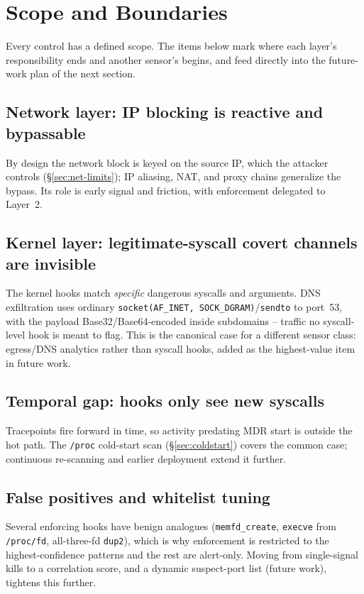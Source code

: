\documentclass[11pt]{article}
\newcommand{\co}[1]{\texttt{#1}}
\begin{document}
\section{Scope and Boundaries}
\label{sec:limits}
Every control has a defined scope. The items below mark where each layer's
responsibility ends and another sensor's begins, and feed directly into the
future-work plan of the next section.

\subsection{Network layer: IP blocking is reactive and bypassable}
\label{sec:l1-limits-detail}
By design the network block is keyed on the source IP, which the attacker
controls (\S\ref{sec:net-limits}); IP aliasing, NAT, and proxy chains
generalize the bypass. Its role is early signal and friction, with
enforcement delegated to Layer~2.

\subsection{Kernel layer: legitimate-syscall covert channels are invisible}
\label{sec:exfil-limits}
The kernel hooks match \emph{specific} dangerous syscalls and arguments. DNS
exfiltration uses ordinary \co{socket(AF\_INET, SOCK\_DGRAM)}/\co{sendto} to
port~53, with the payload Base32/Base64-encoded inside subdomains -- traffic
no syscall-level hook is meant to flag. This is the canonical case for a
different sensor class: egress/DNS analytics rather than syscall hooks, added
as the highest-value item in future work.

\subsection{Temporal gap: hooks only see new syscalls}
\label{sec:gap-limits}
Tracepoints fire forward in time, so activity predating MDR start is outside
the hot path. The \co{/proc} cold-start scan (\S\ref{sec:coldstart}) covers
the common case; continuous re-scanning and earlier deployment extend it
further.

\subsection{False positives and whitelist tuning}
\label{sec:fp-limits}
Several enforcing hooks have benign analogues (\co{memfd\_create},
\co{execve} from \co{/proc/fd}, all-three-fd \co{dup2}), which is why
enforcement is restricted to the highest-confidence patterns and the rest are
alert-only. Moving from single-signal kills to a correlation score, and a
dynamic suspect-port list (future work), tightens this further.
\end{document}
